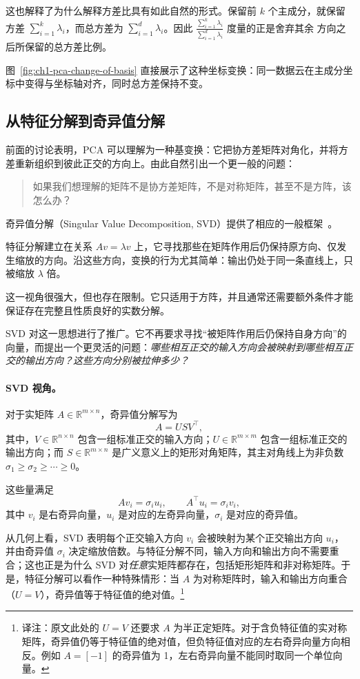 这也解释了为什么解释方差比具有如此自然的形式。保留前 \(k\) 个主成分，就保留方差 \(\sum_{i=1}^k\lambda_i\)，而总方差为 \(\sum_{i=1}^d\lambda_i\)。因此
\(\frac{\sum_{i=1}^k\lambda_i}{\sum_{i=1}^d\lambda_i}\)
度量的正是舍弃其余
方向之后所保留的总方差比例。

图~\ref{fig:ch1-pca-change-of-basis} 直接展示了这种坐标变换：同一数据云在主成分坐标中变得与坐标轴对齐，同时总方差保持不变。



\subsection{从特征分解到奇异值分解}

前面的讨论表明，PCA 可以理解为一种基变换：它把协方差矩阵对角化，并将方差重新组织到彼此正交的方向上。由此自然引出一个更一般的问题：
\begin{quote}
如果我们想理解的矩阵不是协方差矩阵，不是对称矩阵，甚至不是方阵，该怎么办？
\end{quote}
奇异值分解（Singular Value Decomposition, SVD）提供了相应的一般框架~\cite{strang2016introduction}。

特征分解建立在关系 \(Av=\lambda v\) 上，它寻找那些在矩阵作用后仍保持原方向、仅发生缩放的方向。沿这些方向，变换的行为尤其简单：输出仍处于同一条直线上，只被缩放 \(\lambda\) 倍。

这一视角很强大，但也存在限制。它只适用于方阵，并且通常还需要额外条件才能保证存在完整且性质良好的实数分解。

SVD 对这一思想进行了推广。它不再要求寻找“被矩阵作用后仍保持自身方向”的向量，而提出一个更灵活的问题：\emph{哪些相互正交的输入方向会被映射到哪些相互正交的输出方向？这些方向分别被拉伸多少？}

\paragraph{SVD 视角。}
对于实矩阵 \(A\in\mathbb{R}^{m\times n}\)，奇异值分解写为
\[
A = U S V^\top,
\]
其中，\(V\in\mathbb{R}^{n\times n}\) 包含一组标准正交的输入方向；\(U\in\mathbb{R}^{m\times m}\) 包含一组标准正交的输出方向；而 \(S\in\mathbb{R}^{m\times n}\) 是广义意义上的矩形对角矩阵，其主对角线上为非负数
\(\sigma_1\ge\sigma_2\ge\cdots\ge0\)。

这些量满足
\[
A v_i = \sigma_i u_i,
\qquad
A^\top u_i = \sigma_i v_i,
\]
其中 \(v_i\) 是右奇异向量，\(u_i\) 是对应的左奇异向量，\(\sigma_i\) 是对应的奇异值。

从几何上看，SVD 表明每个正交输入方向 \(v_i\) 会被映射为某个正交输出方向 \(u_i\)，并由奇异值 \(\sigma_i\) 决定缩放倍数。与特征分解不同，输入方向和输出方向不需要重合；这也正是为什么 SVD 对\emph{任意}实矩阵都存在，包括矩形矩阵和非对称矩阵。于是，特征分解可以看作一种特殊情形：当 \(A\) 为对称矩阵时，输入和输出方向重合（\(U=V\)），奇异值等于特征值的绝对值。\footnote{译注：原文此处的 \(U=V\) 还要求 \(A\) 为半正定矩阵。对于含负特征值的实对称矩阵，奇异值仍等于特征值的绝对值，但负特征值对应的左右奇异向量方向相反。例如 \(A=[-1]\) 的奇异值为 1，左右奇异向量不能同时取同一个单位向量。}

